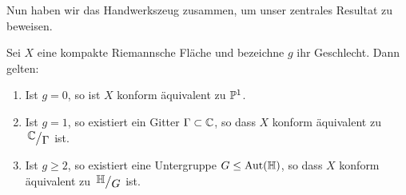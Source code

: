 Nun haben wir das Handwerkszeug zusammen, um unser zentrales Resultat
zu beweisen.

\begin{thm}
  \label{thm:uniformisierung}
  Sei $X$ eine kompakte Riemannsche Fläche und bezeichne $g$ ihr
  Geschlecht. Dann gelten:
  \begin{enumerate}
  \item Ist $g = 0$, so ist $X$ konform äquivalent zu $\P^1$.
  \item Ist $g = 1$, so existiert ein Gitter $\Gamma \subset \C$, so
    dass $X$ konform äquivalent zu $\quot{\C}{\Gamma}$ ist.
  \item Ist $g \geq 2$, so existiert eine Untergruppe $G \leq
    \Aut(\h)$, so dass $X$ konform äquivalent zu $\quot{\h}{G}$ ist.
  \end{enumerate}
\end{thm}

